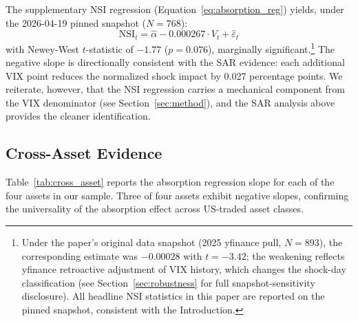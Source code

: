 \documentclass[12pt,a4paper]{article}
\begin{document}
The supplementary NSI regression (Equation~\ref{eq:absorption_reg}) yields, under the 2026-04-19 pinned snapshot ($N = 768$):
\begin{equation}
\text{NSI}_t = \hat{\alpha} - 0.000267 \cdot V_t + \hat{\varepsilon}_t
\label{eq:absorption_result}
\end{equation}
with Newey-West $t$-statistic of $-1.77$ ($p = 0.076$), marginally significant.\footnote{Under the paper's original data snapshot (2025 yfinance pull, $N = 893$), the corresponding estimate was $-0.00028$ with $t = -3.42$; the weakening reflects yfinance retroactive adjustment of VIX history, which changes the shock-day classification (see Section~\ref{sec:robustness} for full snapshot-sensitivity disclosure). All headline NSI statistics in this paper are reported on the pinned snapshot, consistent with the Introduction.} The negative slope is directionally consistent with the SAR evidence: each additional VIX point reduces the normalized shock impact by 0.027 percentage points. We reiterate, however, that the NSI regression carries a mechanical component from the VIX denominator (see Section~\ref{sec:method}), and the SAR analysis above provides the cleaner identification.

\subsection{Cross-Asset Evidence}
\label{sec:cross_asset}

Table~\ref{tab:cross_asset} reports the absorption regression slope for each of the four assets in our sample. Three of four assets exhibit negative slopes, confirming the universality of the absorption effect across US-traded asset classes.
\end{document}
